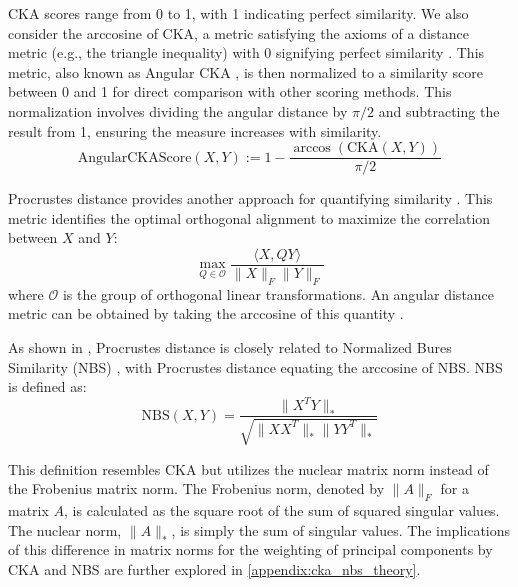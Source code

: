 \documentclass{article} %
\begin{document}
CKA scores range from 0 to 1, with 1 indicating perfect similarity. 
We also consider the arccosine of CKA, a metric satisfying the axioms of a distance metric (e.g., the triangle inequality) with 0 signifying perfect similarity \citep{Williams2021}.
This metric, also known as Angular CKA \citep{lange2022neural}, is then normalized to a similarity score between 0 and 1 for direct comparison with other scoring methods. This normalization involves dividing the angular distance by $\pi/2$ and subtracting the result from 1, ensuring the measure increases with similarity.
$$\text{AngularCKAScore}(X, Y) := 1 - \dfrac{\arccos (\text{CKA}(X, Y))}{\pi / 2}$$

Procrustes distance provides another approach for quantifying similarity \citep{Williams2021, ding2021grounding}. This metric identifies the optimal orthogonal alignment to maximize the correlation between $X$ and $Y$:
$$\max_{Q \in \mathcal{O}} \dfrac{\langle X, QY\rangle}{\|X\|_F \|Y\|_F}$$
where $\mathcal{O}$ is the group of orthogonal linear transformations. An angular distance metric can be obtained by taking the arccosine of this quantity \citep{Williams2021}.

As shown in \citet{harvey2023duality}, Procrustes distance is closely related to Normalized Bures Similarity (NBS) \citep{tang2020similarity}, with Procrustes distance equating the arccosine of NBS. NBS is defined as:
$$\text{NBS}(X, Y) = \dfrac{\|X^T Y\|_*}{\sqrt{\|X X^T\|_* \|Y Y^T\|_*}}$$

This definition resembles CKA but utilizes the nuclear matrix norm instead of the Frobenius matrix norm.
The Frobenius norm, denoted by $\|A\|_F$ for a matrix $A$, is calculated as the square root of the sum of squared singular values. The nuclear norm, $\|A\|_*$, is simply the sum of singular values.
The implications of this difference in matrix norms for the weighting of principal components by CKA and NBS are further explored in \ref{appendix:cka_nbs_theory}.
\end{document}

